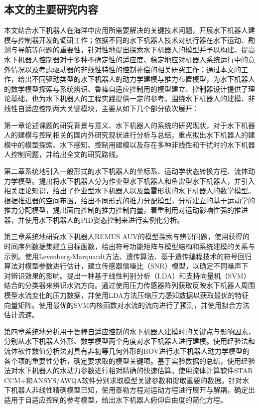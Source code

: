 \subsection{本文的主要研究内容 }

本文结合水下机器人在海洋中应用所需要解决的关键技术问题，开展水下机器人建模与控制器开发的调研工作；依据不同的水下机器人技术对航行器在水下运动、勘测与导航等问题的重要性，针对性地提出探索水下机器人的模型并予以构建、提高水下机器人控制器对于多种不确定性的适应度、稳定地应对机器人系统运行中的意外情况以及考虑驱动器的非线性特性的控制补偿的相关研究工作；通过本文的工作，给出不同驱动类型的水下机器人的动力学建模与推力布置模型，为水下机器人的数学模型探索与系统辨识、鲁棒自适应控制用的模型建立、控制器设计提供了理论基础，也为水下机器人的工程实践提供一定的参考。围绕水下机器人的建模、非线性自适应控制两大关键模块，主要从如下几个部分依次展开：

第一章论述课题的研究背景与意义、水下机器人的系统的研究现状，对于水下机器人的建模与控制相关的国内外研究现状进行分析与总结，重点拟出水下机器人的建模中的模型探索、水下感知、控制用建模以及存在多种非线性和干扰时的水下机器人控制问题，并给出全文的研究路线。

第二章系统地引入一般形式的水下机器人的坐标系、运动学状态转换方程、流体动力学模型。提出将水下机器人分为作业型水下机器人和鱼雷型水下机器人，并引入相关理论知识，给出了作业型水下机器人以及鱼雷形状的水下机器人的数学模型。根据推进器的空间布置，给出不同形式的推力分配模型，分析建立的基于运动学的推力分配模型，提出面向控制的推力控制向量，着重利用对运动影响性强的推进器，并使用水下机器人的PID姿态控制来进行实例化分析。

第三章系统地研究水下机器人REMUS AUV的模型探索与辨识问题，使用获得的时间序列数据集建立目标函数，给出符号功能矩阵与模型结构和系统建模的关系与示例。使用Levenberg-Marquardt方法、遗传算法、基于遗传编程技术的符号回归算法对模型参数进行估计，建立传感器信噪比（SNR）模型，以确定不同噪声下对辨识效果的影响。提出一种基于线性判别分析（LDA）和支持向量机（SVM）结合的分类器来辨识水流方向。通过使用压力传感器阵列获取反映水下机器人周围模型水流变化的压力数据，并使用LDA方法压缩压力感知数据以获取最优的特征向量矩阵。使用最优的SVM内核函数对水流的流向进行了预测，并使用拟合方法估计流速。


第四章系统地分析用于鲁棒自适应控制的水下机器人建模时的关键点与影响因素，分别从水下机器人外形、数学模型两个角度对水下机器人进行建模。使用经验法和流体软件数值分析法对具有非初等几何外形的ROV进行水下机器人动力学模型的各个项的重要性分析，确定要求取的模型关键项。基于实验数据的总结，使用经验法对水下机器人的水动力参数进行相对精确的快速估算。使用流体计算软件STAR CCM+和ANSYS/AWQA软件分别求取模型关键参数和提取重要的数据。针对水下机器人非线性精确模型已知，使用泰勒方程对运动方程进行展开与解耦，确定出适用于自适应控制的参考模型，给出水下机器人俯仰自由度的简化方程。


